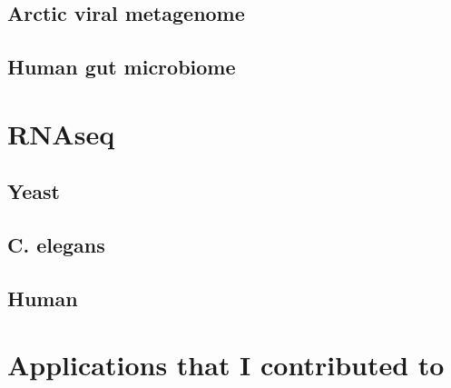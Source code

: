 \subsection{Arctic viral metagenome}

\subsection{Human gut microbiome}


\section{RNAseq}

\subsection{Yeast}

\subsection{C. elegans}

\subsection{Human}


\section{Applications that I contributed to}

